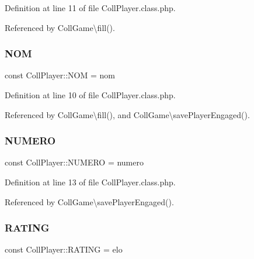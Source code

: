 Definition at line 11 of file Coll\+Player.\+class.\+php.



Referenced by Coll\+Game\textbackslash{}fill().

\mbox{\label{class_coll_player_a721885387ff4ee2683981debbcc0b3ea}} 
\subsubsection{\texorpdfstring{N\+OM}{NOM}}
{\footnotesize\ttfamily const Coll\+Player\+::\+N\+OM = \textquotesingle{}nom\textquotesingle{}}



Definition at line 10 of file Coll\+Player.\+class.\+php.



Referenced by Coll\+Game\textbackslash{}fill(), and Coll\+Game\textbackslash{}save\+Player\+Engaged().

\mbox{\label{class_coll_player_a153bf00b2546a3b0950d867e478bcbbe}} 
\subsubsection{\texorpdfstring{N\+U\+M\+E\+RO}{NUMERO}}
{\footnotesize\ttfamily const Coll\+Player\+::\+N\+U\+M\+E\+RO = \textquotesingle{}numero\textquotesingle{}}



Definition at line 13 of file Coll\+Player.\+class.\+php.



Referenced by Coll\+Game\textbackslash{}save\+Player\+Engaged().

\mbox{\label{class_coll_player_a78aa3b39b3ae67612104d3b1c1e97c6c}} 
\subsubsection{\texorpdfstring{R\+A\+T\+I\+NG}{RATING}}
{\footnotesize\ttfamily const Coll\+Player\+::\+R\+A\+T\+I\+NG = \textquotesingle{}elo\textquotesingle{}}



